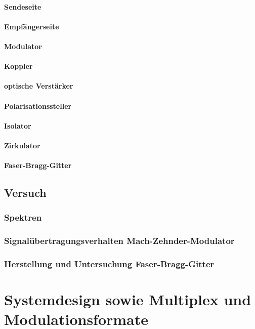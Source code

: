 \documentclass[a4paper]{article}
\begin{document}
\paragraph{Sendeseite}
\paragraph{Empfängerseite}
\paragraph{Modulator}
\paragraph{Koppler}
\paragraph{optische Verstärker}
\paragraph{Polarisationssteller}
\paragraph{Isolator}
\paragraph{Zirkulator}
\paragraph{Faser-Bragg-Gitter}

\subsection{Versuch}
\subsubsection{Spektren}
\subsubsection{Signalübertragungsverhalten Mach-Zehnder-Modulator}
\subsubsection{Herstellung und Untersuchung Faser-Bragg-Gitter}


\newpage
\section{Systemdesign sowie Multiplex und Modulationsformate}
\end{document}
